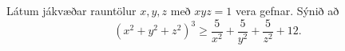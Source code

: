 Látum jákvæðar rauntölur $x,y,z$ með $xyz=1$ vera gefnar. 
Sýnið að
\[
\left(x^2+y^2+z^2 \right)^3\ge \frac{5}{x^2}+\frac{5}{y^2}+\frac{5}{z^2}+12.
\]
